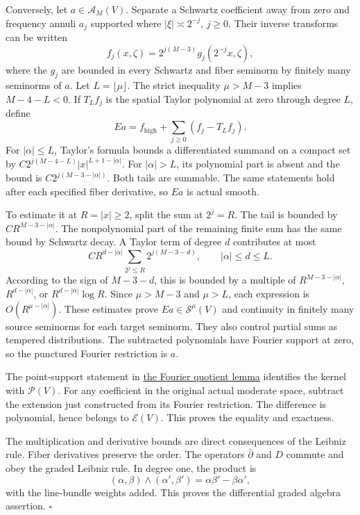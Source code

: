 \documentclass[
  english,
  11pt,
  reqno]{amsart}
\begin{document}
Conversely, let \(a\in\mathscr A_M(V)\). Separate a Schwartz coefficient
away from zero and frequency annuli \(a_j\) supported where
\(|\xi|\asymp2^{-j}\), \(j\ge0\). Their inverse transforms can be
written \[
f_j(x,\zeta)=2^{j(M-3)}g_j(2^{-j}x,\zeta),
\] where the \(g_j\) are bounded in every Schwartz and fiber seminorm by
finitely many seminorms of \(a\). Let \(L=\lfloor\mu\rfloor\). The
strict inequality \(\mu>M-3\) implies \(M-4-L<0\). If \(T_Lf_j\) is the
spatial Taylor polynomial at zero through degree \(L\), define%
 \[
Ea=f_{\mathrm{high}}+\sum_{j\ge0}(f_j-T_Lf_j).
\] For \(|\alpha|\le L\), Taylor's formula bounds a differentiated
summand on a compact set by \(C2^{j(M-4-L)}|x|^{L+1-|\alpha|}\). For
\(|\alpha|>L\), its polynomial part is absent and the bound is
\(C2^{j(M-3-|\alpha|)}\). Both tails are summable. The same statements
hold after each specified fiber derivative, so \(Ea\) is actual smooth.

To estimate it at \(R=|x|\ge2\), split the sum at \(2^j=R\). The tail is
bounded by \(CR^{M-3-|\alpha|}\). The nonpolynomial part of the
remaining finite sum has the same bound by Schwartz decay. A Taylor term
of degree \(d\) contributes at most \[
C R^{d-|\alpha|}
\sum_{2^j\le R}2^{j(M-3-d)},
\qquad |\alpha|\le d\le L.
\] According to the sign of \(M-3-d\), this is bounded by a multiple of
\(R^{M-3-|\alpha|}\), \(R^{d-|\alpha|}\), or \(R^{d-|\alpha|}\log R\).
Since \(\mu>M-3\) and \(\mu>L\), each expression is
\(O(R^{\mu-|\alpha|})\). These estimates prove
\(Ea\in\mathscr S^\mu(V)\) and continuity in finitely many source
seminorms for each target seminorm. They also control partial sums as
tempered distributions. The subtracted polynomials have Fourier support
at zero, so the punctured Fourier restriction is \(a\).

The point-support statement in
\hyperref[lem:online-fourier-polynomial-quotient]{the Fourier quotient
lemma} identifies the kernel with \(\mathscr P(V)\). For any coefficient
in the original actual moderate space, subtract the extension just
constructed from its Fourier restriction. The difference is polynomial,
hence belongs to \(\mathscr E(V)\). This proves the equality and
exactness.

The multiplication and derivative bounds are direct consequences of the
Leibniz rule. Fiber derivatives preserve the order. The operators
\(\bar\partial\) and \(D\) commute and obey the graded Leibniz rule. In
degree one, the product is \[
(\alpha,\beta)\wedge(\alpha',\beta')
=\alpha\beta'-\beta\alpha',
\] with the line-bundle weights added. This proves the differential
graded algebra assertion. \hfill\(\square\)
\end{document}
